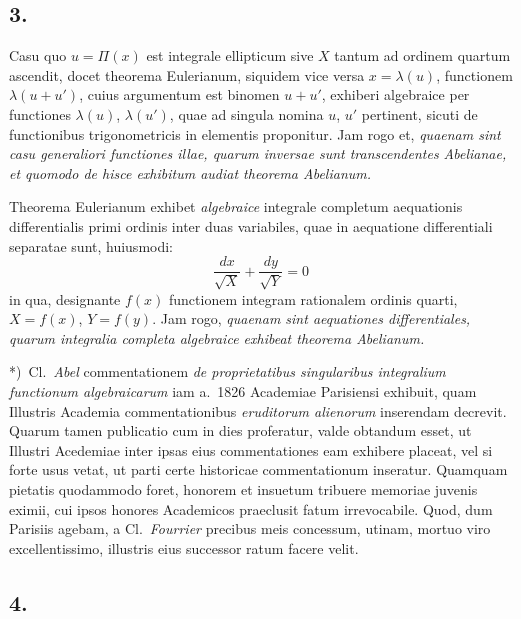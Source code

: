 \documentclass{article}
\begin{document}
\subsection*{3.}

Casu quo $u = \Pi(x)$ est integrale ellipticum sive $X$ tantum ad ordinem quartum ascendit, docet theorema Eulerianum, siquidem vice versa $x = \lambda(u)$, functionem $\lambda(u + u')$, cuius argumentum est binomen $u + u'$, exhiberi algebraice per functiones $\lambda(u)$, $\lambda(u')$, quae ad singula nomina $u$, $u'$ pertinent, sicuti de functionibus trigonometricis in elementis proponitur. Jam rogo et, \emph{quaenam sint casu generaliori functiones illae, quarum inversae sunt transcendentes Abelianae, et quomodo de hisce exhibitum audiat theorema Abelianum.}

Theorema Eulerianum exhibet \emph{algebraice} integrale completum aequationis differentialis primi ordinis inter duas variabiles, quae in aequatione differentiali separatae sunt, huiusmodi:
\[ \frac{dx}{\sqrt{X}} + \frac{dy}{\sqrt{Y}} = 0 \]
in qua, designante $f(x)$ functionem integram rationalem ordinis quarti, $X = f(x)$, $Y = f(y)$. Jam rogo, \emph{quaenam sint aequationes differentiales, quarum integralia completa algebraice exhibeat theorema Abelianum.}

*)~Cl.\ \emph{Abel} commentationem \emph{de proprietatibus singularibus integralium functionum algebraicarum} iam a.\ 1826 Academiae Parisiensi exhibuit, quam Illustris Academia commentationibus \emph{eruditorum alienorum} inserendam decrevit. Quarum tamen publicatio cum in dies proferatur, valde obtandum esset, ut Illustri Acedemiae inter ipsas eius commentationes eam exhibere placeat, vel si forte usus vetat, ut parti certe historicae commentationum inseratur. Quamquam pietatis quodammodo foret, honorem et insuetum tribuere memoriae juvenis eximii, cui ipsos honores Academicos praeclusit fatum irrevocabile. Quod, dum Parisiis agebam, a Cl.\ \emph{Fourrier} precibus meis concessum, utinam, mortuo viro excellentissimo, illustris eius successor ratum facere velit.

\subsection*{4.}
\end{document}
